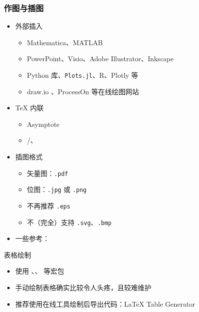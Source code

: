 \begin{frame}[fragile]
  \frametitle{作图与插图}
  \begin{itemize}
    \item 外部插入

          \begin{itemize}
            \item Mathematica、MATLAB
            \item PowerPoint、Visio、Adobe Illustrator、Inkscape
            \item Python  库、\texttt{Plots.jl}、R、Plotly 等
            \item draw.io 、ProcessOn 
                  等在线绘图网站
          \end{itemize}

    \item \TeX{} 内联

          \begin{itemize}
            \item Asymptote
            \item \alert{/、}
          \end{itemize}

    \item 插图格式

          \begin{itemize}
            \item 矢量图：\verb|.pdf|
            \item 位图：\verb|.jpg| 或 \verb|.png|
            \item \alert{不再推荐 \texttt{.eps}}
            \item 不（完全）支持 \verb|.svg|、\verb|.bmp|
          \end{itemize}

    \item 一些参考：
  \end{itemize}
\end{frame}

\begin{frame}[fragile]{表格绘制}
  \begin{itemize}
    \item 使用 、、 等宏包
    \item 手动绘制表格确实比较令人头疼，且较难维护
    \item 推荐使用在线工具绘制后导出代码：\LaTeX{} Table Generator
  \end{itemize}
\end{frame}

